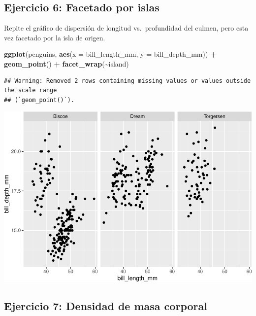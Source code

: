 \documentclass[
]{book}
\newenvironment{Shaded}{\begin{snugshade}}{\end{snugshade}}
\newcommand{\AttributeTok}[1]{\textcolor[rgb]{0.13,0.29,0.53}{#1}}
\newcommand{\FunctionTok}[1]{\textcolor[rgb]{0.13,0.29,0.53}{\textbf{#1}}}
\newcommand{\NormalTok}[1]{#1}
\newcommand{\SpecialCharTok}[1]{\textcolor[rgb]{0.81,0.36,0.00}{\textbf{#1}}}
\begin{document}
\hypertarget{ejercicio-6-facetado-por-islas}{%
\subsection{Ejercicio 6: Facetado por islas}\label{ejercicio-6-facetado-por-islas}}

Repite el gráfico de dispersión de longitud vs.~profundidad del culmen, pero esta vez facetado por la isla de origen.

\begin{Shaded}
\begin{Highlighting}[]
\FunctionTok{ggplot}\NormalTok{(penguins, }\FunctionTok{aes}\NormalTok{(}\AttributeTok{x =}\NormalTok{ bill\_length\_mm, }\AttributeTok{y =}\NormalTok{ bill\_depth\_mm)) }\SpecialCharTok{+}
  \FunctionTok{geom\_point}\NormalTok{() }\SpecialCharTok{+}
  \FunctionTok{facet\_wrap}\NormalTok{(}\SpecialCharTok{\textasciitilde{}}\NormalTok{island)}
\end{Highlighting}
\end{Shaded}

\begin{verbatim}
## Warning: Removed 2 rows containing missing values or values outside the scale range
## (`geom_point()`).
\end{verbatim}

\includegraphics{bookdown-demo_files/figure-latex/unnamed-chunk-182-1.pdf}

\hypertarget{ejercicio-7-densidad-de-masa-corporal}{%
\subsection{Ejercicio 7: Densidad de masa corporal}\label{ejercicio-7-densidad-de-masa-corporal}}
\end{document}
